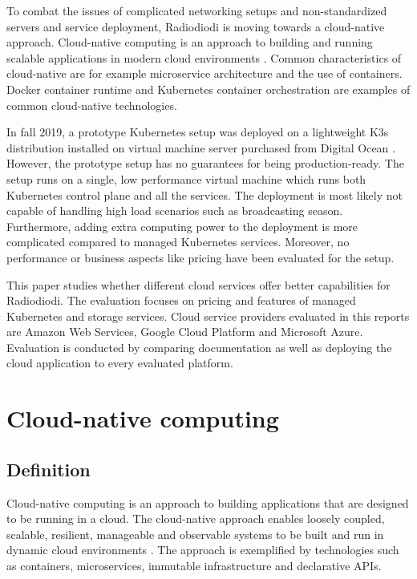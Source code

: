 \documentclass[article]{aaltoseries}
\begin{document}
To combat the issues of complicated networking setups and non-standardized servers and service deployment, Radiodiodi is moving towards a cloud-native approach. Cloud-native computing is an approach to building and running scalable applications in modern cloud environments \cite{cncf}. Common characteristics of cloud-native are for example  microservice architecture and the use of containers. Docker container runtime and Kubernetes container orchestration are examples of common cloud-native technologies.

In fall 2019, a prototype Kubernetes setup was deployed on a lightweight K3s distribution installed on virtual machine server purchased from Digital Ocean \cite{tuomihalinen2019}. However, the prototype setup has no guarantees for being production-ready. The setup runs on a single, low performance virtual machine which runs both Kubernetes control plane and all the services. The deployment is most likely not capable of handling high load scenarios such as broadcasting season. Furthermore, adding extra computing power to the deployment is more complicated compared to managed Kubernetes services. Moreover, no performance or business aspects like pricing have been evaluated for the setup.

This paper studies whether different cloud services offer better capabilities for Radiodiodi. The evaluation focuses on pricing and features of managed Kubernetes and storage services. Cloud service providers evaluated in this reports are Amazon Web Services, Google Cloud Platform and Microsoft Azure. Evaluation is conducted by comparing documentation as well as deploying the cloud application to every evaluated platform.

\newpage
\section{Cloud-native computing}

\subsection{Definition}

Cloud-native computing is an approach to building applications that are designed to be running in a cloud. The cloud-native approach enables loosely coupled, scalable, resilient, manageable and observable systems to be built and run in dynamic cloud environments \cite{cncf}. The approach is exemplified by technologies such as containers, microservices, immutable infrastructure and declarative APIs.
\end{document}
